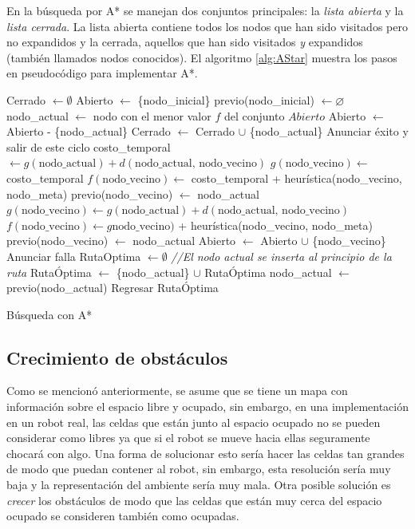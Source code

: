 \documentclass[letterpaper,12pt]{article}
\begin{document}
En la búsqueda por A* se manejan dos conjuntos principales: la \textit{lista abierta} y la \textit{lista cerrada}. La lista abierta contiene todos los nodos que han sido visitados pero no expandidos y la cerrada, aquellos que han sido visitados \textit{y} expandidos (también llamados nodos conocidos). El algoritmo \ref{alg:AStar} muestra los pasos en pseudocódigo para implementar A*. 
\begin{algorithm}
\DontPrintSemicolon
{}
Cerrado $\leftarrow \emptyset$\;
Abierto $\leftarrow$ \{nodo\_inicial\}\;
previo(nodo\_inicial) $\leftarrow \varnothing$\;
{
  nodo\_actual $\leftarrow$ nodo con el menor valor $f$ del conjunto $Abierto$\;
  Abierto $\leftarrow$ Abierto - \{nodo\_actual\}\;
  Cerrado $\leftarrow$ Cerrado $\cup$ \{nodo\_actual\}\;
  {
    Anunciar éxito y salir de este ciclo\;
  }
  {
    {
      costo\_temporal $\leftarrow g(\textrm{nodo\_actual}) + d(\textrm{nodo\_actual, nodo\_vecino})$\;
      {
        $g(\textrm{nodo\_vecino})\leftarrow$ costo\_temporal\;
        $f(\textrm{nodo\_vecino})\leftarrow$ costo\_temporal + heurística(nodo\_vecino, nodo\_meta)\;
        previo(nodo\_vecino) $\leftarrow$ nodo\_actual\;
      }
    }
    {
      $g(\textrm{nodo\_vecino})\leftarrow g(\textrm{nodo\_actual}) + d(\textrm{nodo\_actual, nodo\_vecino})$\;
      $f(\textrm{nodo\_vecino})\leftarrow g\textrm{nodo\_vecino})$  + heurística(nodo\_vecino, nodo\_meta)\;
      previo(nodo\_vecino) $\leftarrow$ nodo\_actual\;
      Abierto $\leftarrow$ Abierto $\cup$ \{nodo\_vecino\}\; 
    }
  }
}
{
  Anunciar falla\;
}
{
  RutaOptima $\leftarrow\emptyset$ \;
  {
    \textit{//El nodo actual se inserta al principio de la ruta}\;
    RutaÓptima $\leftarrow$ \{nodo\_actual\} $\cup$ RutaÓptima \;
    nodo\_actual $\leftarrow$ previo(nodo\_actual)\;
  }
  Regresar RutaÓptima
}
\caption{Búsqueda con A*}
\label{alg:AStar}
\end{algorithm}

\subsection{Crecimiento de obstáculos}
Como se mencionó anteriormente, se asume que se tiene un mapa con información sobre el espacio libre y ocupado, sin embargo, en una implementación en un robot real, las celdas que están junto al espacio ocupado no se pueden considerar como libres ya que si el robot se mueve hacia ellas seguramente chocará con algo. Una forma de solucionar esto sería hacer las celdas tan grandes de modo que puedan contener al robot, sin embargo, esta resolución sería muy baja y la representación del ambiente sería muy mala. Otra posible solución es \textit{crecer} los obstáculos de modo que las celdas que están muy cerca del espacio ocupado se consideren también como ocupadas.
\end{document}
